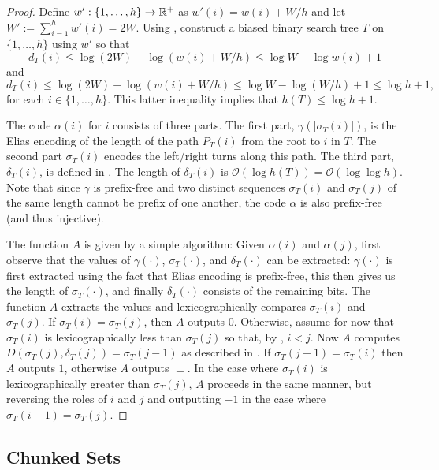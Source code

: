 \documentclass[kpfonts]{patmorin}
\newcommand{\Oh}{\mathcal{O}}
\let\le\leqslant
\begin{document}
\begin{proof}
  Define $w':\{1,\dots,h\}\to \mathbb{R}^+$ as $w'(i)=w(i)+W/h$ and let $W':=\sum_{i=1}^h w'(i)=2W$.
  Using , construct a biased binary search tree $T$ on $\{1,\dots,h\}$ using $w'$ so that
  \[
    d_T(i)\le\log (2W)-\log(w(i)+W/h) \le \log W-\log w(i)+1
  \]
  and
  \[
  d_T(i)\le\log (2W)-\log(w(i)+W/h) \le \log W-\log (W/h)+1 \le \log h + 1,
  \]
  for each $i\in\{1,\dots,h\}$.  This latter inequality implies that $h(T)\le\log h + 1$.

  The code $\alpha(i)$ for $i$ consists of three parts.  The first part, $\gamma(|\sigma_T(i)|)$, is the Elias encoding of the length of the path $P_T(i)$ from the root to $i$ in $T$. The second part $\sigma_T(i)$ encodes the left/right turns along this path. The third part, $\delta_T(i)$, is defined in .
  The length of $\delta_T(i)$ is $\Oh(\log h(T))=\Oh(\log\log h)$. Note that since $\gamma$ is prefix-free and two distinct sequences $\sigma_T(i)$ and $\sigma_T(j)$ of the same length cannot be prefix of one another, the code $\alpha$ is also prefix-free (and thus injective).

  The function $A$ is given by a simple algorithm: Given $\alpha(i)$ and $\alpha(j)$, first observe that the values of $\gamma(\cdot)$, $\sigma_T(\cdot)$, and $\delta_T(\cdot)$ can be extracted: $\gamma(\cdot)$ is first extracted using the fact that Elias encoding is prefix-free, this then gives us the length of $\sigma_T(\cdot)$, and finally $\delta_T(\cdot)$ consists of the remaining bits.
   The function $A$ extracts the values and lexicographically compares $\sigma_T(i)$ and $\sigma_T(j)$.  If $\sigma_T(i)=\sigma_T(j)$, then $A$ outputs $0$.
   Otherwise, assume for now that $\sigma_T(i)$ is lexicographically less than $\sigma_T(j)$ so that, by , $i < j$.  Now $A$ computes $D(\sigma_T(j),\delta_T(j))=\sigma_T(j-1)$ as described in .
   If $\sigma_T(j-1)=\sigma_T(i)$ then $A$ outputs $1$, otherwise $A$ outputs $\perp$.
  In the case where $\sigma_T(i)$ is lexicographically greater than $\sigma_T(j)$, $A$ proceeds in the same manner, but reversing the roles of $i$ and $j$ and outputting $-1$ in the case where $\sigma_T(i-1)=\sigma_T(j)$.
\end{proof}

\subsection{Chunked Sets}
\end{document}
